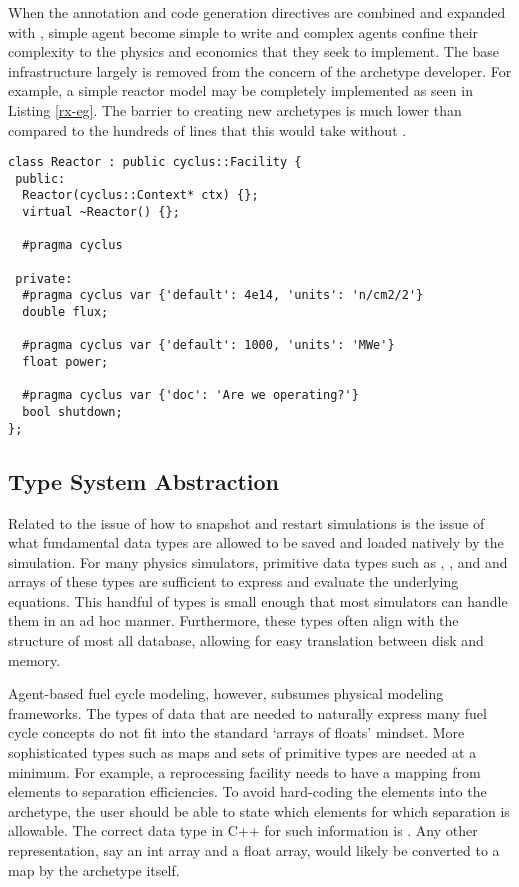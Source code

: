 When the annotation and code generation directives are combined and expanded with 
\cycpp, simple agent become simple to write and complex agents confine their 
complexity to the physics and economics that they seek to implement. The base \cyclus
infrastructure largely is removed from the concern of the archetype developer.
For example, a simple reactor model may be completely implemented as seen in 
Listing \ref{rx-eg}. The barrier to creating new archetypes is much lower than 
compared to the hundreds of lines that this would take without \cycpp.

\begin{lstlisting}[caption={Simple Reactor Archetype}, label=rx-eg]
class Reactor : public cyclus::Facility {
 public:
  Reactor(cyclus::Context* ctx) {};
  virtual ~Reactor() {};

  #pragma cyclus

 private:
  #pragma cyclus var {'default': 4e14, 'units': 'n/cm2/2'}
  double flux;

  #pragma cyclus var {'default': 1000, 'units': 'MWe'}
  float power;

  #pragma cyclus var {'doc': 'Are we operating?'}
  bool shutdown;
};
\end{lstlisting}

\subsection{Type System Abstraction}

Related to the issue of how to snapshot and restart simulations is the issue of 
what fundamental data types are allowed to be saved and loaded natively by the 
simulation. For many physics simulators, primitive data types such as , 
, and  and arrays of these types are sufficient to 
express and evaluate the underlying equations. This handful of types is small enough 
that most simulators can handle them in an ad hoc manner. Furthermore, these types
often align with the structure of most all database, allowing for easy translation
between disk and memory.

Agent-based fuel cycle modeling, however, subsumes physical modeling frameworks.
The types of data that are needed to naturally express many fuel cycle concepts 
do not fit into the standard `arrays of floats' mindset.  More sophisticated types
such as maps and sets of primitive types are needed at a minimum. For example, 
a reprocessing facility needs to have a mapping from elements to separation 
efficiencies. To avoid hard-coding the elements into the archetype, the user should 
be able to state which elements for which separation is allowable. The correct data
type in C++ for such information is . Any other 
representation, say an int array and a float array,  would likely be converted to 
a map by the archetype itself.

